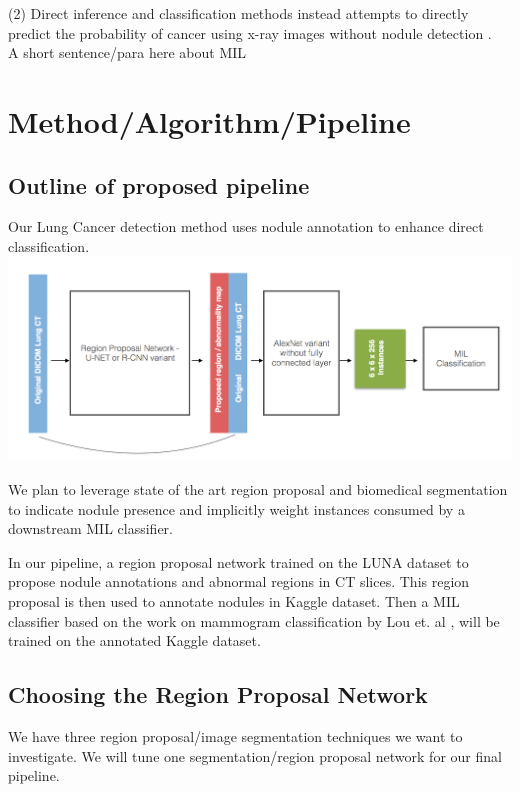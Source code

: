 \documentclass[twocolumn,10pt]{article}
\newcommand{\red}[1]{{\color{red}#1}}
\newcommand{\temp}[1]{{\red{#1}\\}}
\begin{document}
(2) Direct inference and classification methods
instead attempts to directly predict the probability of cancer using x-ray 
images without nodule detection
\cite{Kuruvilla_2013, classificationOfNodules_2016}. \\

\temp{A short sentence/para here about MIL}



\section{Method/Algorithm/Pipeline}


\subsection{Outline of proposed pipeline}
Our Lung Cancer detection method uses nodule annotation to enhance direct
classification. 
\includegraphics[width=\columnwidth]{img/architecture.png}


We plan to leverage state of the art region proposal and biomedical segmentation
to indicate nodule presence and implicitly weight instances consumed by a 
downstream MIL classifier.

In our pipeline, a region proposal network trained on the LUNA dataset to propose
nodule annotations and abnormal regions in CT slices. This region proposal 
is then used to annotate nodules in Kaggle dataset. Then a MIL classifier based 
on the work on mammogram  classification by Lou et. al \cite{DBLP:journals/corr/ZhuLVX16},
will be trained on the annotated Kaggle dataset.

\subsection{Choosing the Region Proposal Network}
We have three region proposal/image segmentation techniques we want to investigate.
We will tune one segmentation/region proposal network for our final pipeline. 
\end{document}
